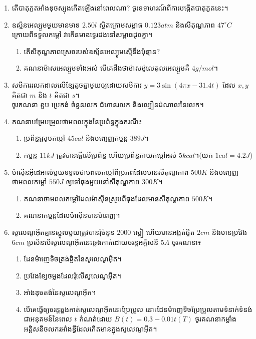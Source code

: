 \documentclass{officialexam}
\begin{document}
\begin{enumerate}[I]
	\item តើបាតុភូតអាំងឌុចស្យុងកើតឡើងនៅពេលណា? ចូរឧទាហរណ៍ពីការបង្កើតបាតុភូតនេះ។
	\item ឧស្ម័នអេល្យូមមួយមានមាឌ $2.50l$ ស្ថិតក្រោមសម្ពាធ $0.123atm$ និងសីតុណ្ហភាព $47^\circ C$ ក្រោយពីទទួលកម្តៅ វាកើនមាឌទ្វេរដងនៅសម្ពាធដូចគ្នា។
	\begin{enumerate}[k]
		\item តើសីតុណ្ហភាពស្រេចរបស់ឧស្ម័នអេល្យូមស្មើនឹងប៉ុន្មាន?
		\item គណនាម៉ាសអេល្យូមទាំងអស់ បើគេដឹងថាម៉ាសម៉ូលេគុលអេល្យូមគឺ $4g/mol$។
	\end{enumerate}
	\item សមីការរលកដាលលើខ្សែតូចឆ្មាមួយឲ្យដោយសមីការ $y=3\sin\left(4\pi x -31.4t\right)$ ដែល $x,y$ គិតជា $m$ និង $t$ គិតជា $s$។\\ ចូរគណនា ខួប ប្រេកង់ ចំនួនរលក ជំហានរលក និងល្បឿនដំណាលនៃរលក។
	\item គណនាបម្រែបម្រួលថាមពលក្នុងនៃប្រព័ន្ធក្នុងករណី៖
	\begin{enumerate}[k]
		\item ប្រព័ន្ធស្រូបកម្តៅ $45cal$ និងបញ្ចេញកម្មន្ត $389J$។
		\item កម្មន្ត $11kJ$ ត្រូវបានធ្វើលើប្រព័ន្ធ ហើយប្រព័ន្ធភាយកម្តៅអស់ $5kcal$។(យក $1cal=4.2J$)
	\end{enumerate}
	\item ម៉ាសុីនអុីដេអាល់មួយទទួលថាមពលកម្តៅពីប្រភពដែលមានសីតុណ្ហភាព $500K$ និងបញ្ចេញថាមពលកម្តៅ $550J$ ឲ្យទៅធុងមួយនៅសីតុណ្ហភាព $300K$។
	\begin{enumerate}[k]
		\item គណនាថាមពលកម្តៅដែលម៉ាសុីនស្រូបពីធុងដែលមានសីតុណ្ហភាព $500K$។
		\item គណនាកម្មន្តដែលម៉ាសុីនបានបំពេញ។
	\end{enumerate}
	\item សូលេណូអុីតគ្មានស្នូលមួយត្រូវបានរុំចំនួន $2000$ ស្ពៀ ហើយមានអង្កត់ផ្ចិត $2cm$ និងមានប្រវែង $6cm$ ប្រសិនបើសូលេណូអុីតនេះឆ្លងកាត់ដោយចរន្តអគ្គិសនី $5A$ ចូរគណនា៖
	\begin{enumerate}[k]
		\item ដែនម៉ាញេទិចត្រង់ផ្ចិតនៃសូលេណូអុីត។
		\item ប្រវែងខ្សែចម្លងដែលរុំលើសូលេណូអុីត។
		\item អាំងឌុចតង់នៃសូលេណូអុីត។
		\item បើគេធ្វើឲ្យចរន្តឆ្លងកាត់សូលេណូអុីតនេះប្រែប្រួល នោះដែនម៉ាញេទិចប្រែប្រួលតាមទំនាក់ទំនង់ជាអនុគមន៍នៃពេល $t$ កំណត់ដោយ $B(t)=0.3-0.01t(T)$ ចូរគណនាកម្លាំងអគ្គិសនីចលករអាំងឌ្វីដែលកើតមានក្នុងសូលេណូអុីត។\\

\end{enumerate}
\end{enumerate}
\end{document}

